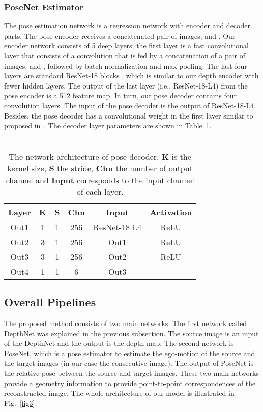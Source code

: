 \documentclass[journal]{IEEEtran}
\begin{document}
\subsubsection{PoseNet Estimator}
The pose estimation network is a regression network with encoder and decoder parts. The pose encoder receives a concatenated pair of images,  and . Our encoder network consists of 5 deep layers; the first layer is a fast convolutional layer that consists of a  convolution that is fed by a concatenation of a pair of images,  and , followed by batch normalization and max-pooling. The last four layers are standard ResNet-18 blocks \cite{he2016deep}, which is similar to our depth encoder with fewer hidden layers. The output of the last layer (i.e., ResNet-18-L4) from the pose encoder is a 512 feature map. In turn, our pose decoder contains four convolution layers.  The input of the pose decoder is the output of ResNet-18-L4. Besides, the pose decoder has a convolutional weight in the first layer similar to proposed in~\cite{Godard2018}. The decoder layer parameters are shown in Table~\ref{table3}.  

\begin{table}[h!]
\centering
\captionsetup{justification=centering}
\caption{\\The network architecture of pose decoder. \textbf{K} is the kernel size, \textbf{S} the stride, \textbf{Chn} the number of output channel and \textbf{Input} corresponds to the input channel of each layer.}
\def\arraystretch{1.5}
\begin{tabular}{|c|c|c|c|c|c|}
\hline
\textbf{Layer} & \textbf{K} & \textbf{S} & \textbf{Chn} & \textbf{Input} & \textbf{Activation} \\ \hline\hline
Out1            & 1          & 1          & 256          & ResNet-18 L4             & ReLU                \\ \hline
Out2           & 3          & 1          & 256          & Out1           & ReLU                \\ \hline
Out3           & 3          & 1          & 256          & Out2           & ReLU                \\ \hline
Out4            & 1          & 1          & 6            & Out3           & -                   \\ \hline
\end{tabular}
\label{table3}
\end{table}

\subsection{Overall Pipelines}
The proposed method consists of two main networks. The first network called DepthNet was explained in the previous subsection. The source image is an input of the DepthNet and the output is the depth map. The second network is PoseNet, which is a pose estimator to estimate the ego-motion of the source and the target images (in our case the consecutive image). The output of PoseNet is the relative pose between the source and target images. These two main networks provide a geometry information to provide point-to-point correspondences of the reconstructed image. The whole architecture of our model is illustrated in Fig.~\ref{fig3}.
\end{document}
